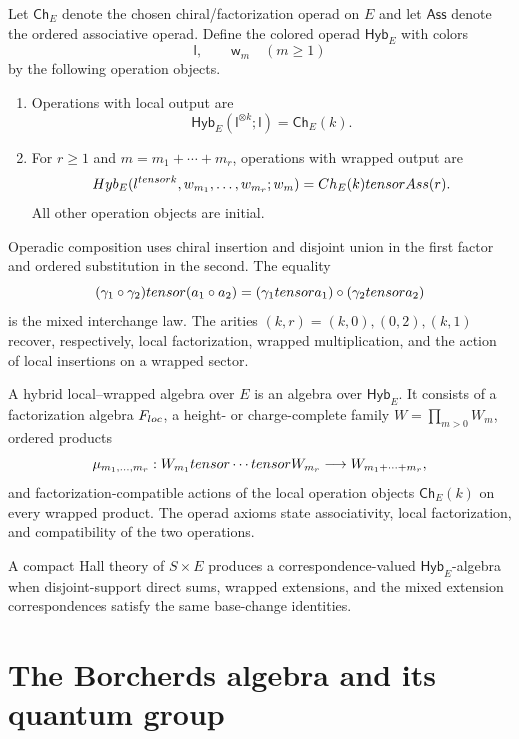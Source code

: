 \begin{definition}
Let $\mathsf{Ch}_E$ denote the chosen chiral/factorization operad on $E$ and let $\mathsf{Ass}$ denote the ordered associative operad. Define the colored operad $\mathsf{Hyb}_E$ with colors
\[
 \mathsf l,\qquad \mathsf w_m\quad(m\ge1)
\]
by the following operation objects.
\begin{enumerate}
\item Operations with local output are
\[
 \mathsf{Hyb}_E(\mathsf l^{\otimes k};\mathsf l)=\mathsf{Ch}_E(k).
\]
\item For $r\ge1$ and $m=m_1+\cdots+m_r$, operations with wrapped output are
\[
 Hyb_E
 (l^{tensor k},w_{m_1},\ldots,w_{m_r};w_m)
 =Ch_E(k)tensorAss(r).
\]
All other operation objects are initial.
\end{enumerate}
Operadic composition uses chiral insertion and disjoint union in the first factor and ordered substitution in the second. The equality
\[
 (\gamma_1\circ\gamma_2)tensor(a_1\circ a_2)
 = (\gamma_1tensor a_1)\circ(\gamma_2tensor a_2)
\]
is the mixed interchange law. The arities $(k,r)=(k,0),(0,2),(k,1)$ recover, respectively, local factorization, wrapped multiplication, and the action of local insertions on a wrapped sector.
\end{definition}

\begin{definition}
A hybrid local--wrapped algebra over $E$ is an algebra over $\mathsf{Hyb}_E$. It consists of a factorization algebra $F_{loc}$, a height- or charge-complete family $W=\prod_{m>0}W_m$, ordered products
\[
 \mu_{m_1,\ldots,m_r}:W_{m_1}tensor\cdots tensor W_{m_r}
 \longrightarrow W_{m_1+\cdots+m_r},
\]
and factorization-compatible actions of the local operation objects $\mathsf{Ch}_E(k)$ on every wrapped product. The operad axioms state associativity, local factorization, and compatibility of the two operations.
\end{definition}

A compact Hall theory of $S\times E$ produces a correspondence-valued $\mathsf{Hyb}_E$-algebra when disjoint-support direct sums, wrapped extensions, and the mixed extension correspondences satisfy the same base-change identities.


\part{The Borcherds algebra and its quantum group}


